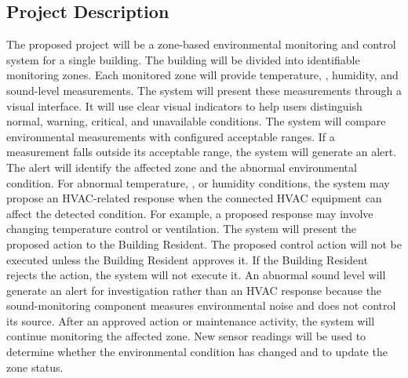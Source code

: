 \documentclass[11pt,a4paper]{article}
\begin{document}
\subsection*{Project Description}
The proposed project will be a zone-based environmental monitoring and control system for a single building. The building will be divided into identifiable monitoring zones. Each monitored zone will provide temperature, \COtwo, humidity, and sound-level measurements. The system will present these measurements through a visual interface. It will use clear visual indicators to help users distinguish normal, warning, critical, and unavailable conditions. The system will compare environmental measurements with configured acceptable ranges. If a measurement falls outside its acceptable range, the system will generate an alert. The alert will identify the affected zone and the abnormal environmental condition. For abnormal temperature, \COtwo, or humidity conditions, the system may propose an HVAC-related response when the connected HVAC equipment can affect the detected condition. For example, a proposed response may involve changing temperature control or ventilation. The system will present the proposed action to the Building Resident. The proposed control action will not be executed unless the Building Resident approves it. If the Building Resident rejects the action, the system will not execute it. An abnormal sound level will generate an alert for investigation rather than an HVAC response because the sound-monitoring component measures environmental noise and does not control its source. After an approved action or maintenance activity, the system will continue monitoring the affected zone. New sensor readings will be used to determine whether the environmental condition has changed and to update the zone status.
\end{document}
